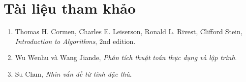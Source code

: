 \documentclass[11pt]{article}
\begin{document}
\section*{Tài liệu tham khảo}

\begin{enumerate}
  \item Thomas H. Cormen, Charles E. Leiserson, Ronald L. Rivest, Clifford
  Stein, \textit{Introduction to Algorithms}, 2nd edition.
  \item Wu Wenhu và Wang Jiande, \textit{Phân tích thuật toán thực dụng và lập
  trình}.
  \item Su Chun, \textit{Nhìn vấn đề từ tính đặc thù}.
\end{enumerate}
\end{document}
